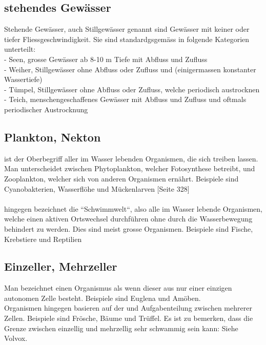 \documentclass{article}
\begin{document}
    \subsection{stehendes Gewässer}
    
        Stehende Gewässer, auch Stillgewässer genannt sind Gewässer mit keiner oder tiefer Fliessgeschwindigkeit. Sie sind standardgsgemäss in folgende Kategorien unterteilt: \\
        
        - Seen, grosse Gewässer ab 8-10 m Tiefe mit Abfluss und Zufluss \\
        - Weiher, Stillgewässer ohne Abfluss oder Zufluss und (einigermassen konstanter Wassertiefe) \\
        - Tümpel, Stillgewässer ohne Abfluss oder Zufluss, welche periodisch austrocknen \\
        - Teich, menschengeschaffenes Gewässer mit Abfluss und Zufluss und oftmals periodischer Austrocknung \\ \cite{Kleingewasserkunde}
    
    \subsection{Plankton, Nekton}
    
         ist der Oberbegriff aller im Wasser lebenden Organismen, die sich treiben lassen. Man unterscheidet zwischen Phytoplankton, welcher Fotosynthese betreibt, und Zooplankton, welcher sich von anderen Organismen ernährt. Beispiele sind Cyanobakterien, Wasserflöhe und Mückenlarven \cite{Biobuch} [Seite 328] \\ \\
        \vspace{5mm}
         hingegen bezeichnet die ``Schwimmwelt``, also alle im Wasser lebende Organismen, welche einen aktiven Ortswechsel durchführen ohne durch die Wasserbewegung behindert zu werden. Dies sind meist grosse Organismen. Beispiele sind Fische, Krebstiere und Reptilien \cite{Spektrum}
    
    \subsection{Einzeller, Mehrzeller}
    
        Man bezeichnet einen Organismus als  wenn dieser aus nur einer einzigen autonomen Zelle besteht. Beispiele sind Euglena und Amöben. \\  Organismen hingegen basieren auf der und Aufgabenteilung zwischen mehrerer Zellen. Beispiele sind Frösche, Bäume und Trüffel.
        Es ist zu bemerken, dass die Grenze zwischen einzellig und mehrzellig sehr schwammig sein kann: Siehe Volvox.
    
\end{document}
